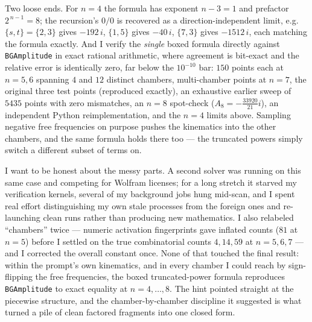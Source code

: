 \documentclass{article}
\begin{document}
Two loose ends. For $n=4$ the formula has exponent $n-3=1$ and prefactor
$2^{\,n-1}=8$; the recursion's $0/0$ is recovered as a direction-independent
limit, e.g.\ $\{s,t\}=\{2,3\}$ gives $-192\,i$, $\{1,5\}$ gives $-40\,i$,
$\{7,3\}$ gives $-1512\,i$, each matching the formula exactly. And I verify the
\emph{single} boxed formula directly against \texttt{BGAmplitude} in exact
rational arithmetic, where agreement is bit-exact and the relative error is
identically zero, far below the $10^{-10}$ bar: $150$ points each at $n=5,6$
spanning $4$ and $12$ distinct chambers, multi-chamber points at $n=7$, the
original three test points (reproduced exactly), an exhaustive earlier sweep of
$5435$ points with zero mismatches, an $n=8$ spot-check
($A_8=-\tfrac{33920}{21}i$), an independent Python reimplementation, and the
$n=4$ limits above. Sampling negative free frequencies on purpose pushes the
kinematics into the other chambers, and the same formula holds there too --- the
truncated powers simply switch a different subset of terms on.

I want to be honest about the messy parts. A second solver was running on this
same case and competing for Wolfram licenses; for a long stretch it starved my
verification kernels, several of my background jobs hung mid-scan, and I spent
real effort distinguishing my own stale processes from the foreign ones and
re-launching clean runs rather than producing new mathematics. I also relabeled
``chambers'' twice --- numeric activation fingerprints gave inflated counts
($81$ at $n=5$) before I settled on the true combinatorial counts $4,14,59$ at
$n=5,6,7$ --- and I corrected the overall constant once. None of that touched the
final result: within the prompt's own kinematics, and in every chamber I could
reach by sign-flipping the free frequencies, the boxed truncated-power formula
reproduces \texttt{BGAmplitude} to exact equality at $n=4,\dots,8$. The hint
pointed straight at the piecewise structure, and the chamber-by-chamber discipline
it suggested is what turned a pile of clean factored fragments into one closed form.
\end{document}
